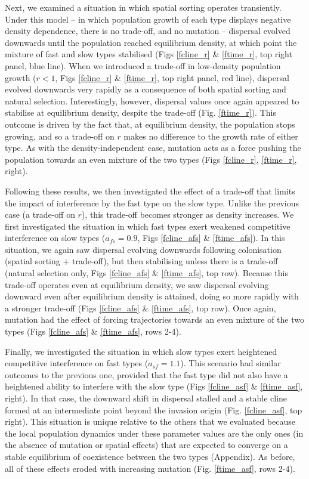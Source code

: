 \documentclass[11pt]{article}
\begin{document}
Next, we examined a situation in which spatial sorting operates transiently.  Under this model -- in which population growth of each type displays negative density dependence, there is no trade-off, and no mutation -- dispersal evolved downwards until the population reached equilibrium density, at which point the mixture of fast and slow types stabilised (Figs \ref{fcline_r} \& \ref{ftime_r}, top right panel, blue line). When we introduced a trade-off in low-density population growth ($r<1$, Figs \ref{fcline_r} \& \ref{ftime_r}, top right panel, red line), dispersal evolved downwards very rapidly as a consequence of both spatial sorting and natural selection.  Interestingly, however, dispersal values once again appeared to stabilise at equilibrium density, despite the trade-off (Fig. \ref{ftime_r}).  This outcome is driven by the fact that, at equilibrium density, the population stops growing, and so a trade-off on $r$ makes no difference to the growth rate of either type.  As with the density-independent case, mutation acts as a force pushing the population towards an even mixture of the two types (Figs \ref{fcline_r}, \ref{ftime_r}, right).

Following these results, we then investigated the effect of a trade-off that limits the impact of interference by the fast type on the slow type.  Unlike the previous case (a trade-off on $r$), this trade-off becomes stronger as density increases. We first investigated the situation in which fast types exert weakened competitive interference on slow types ($a_{fs}=0.9$, Figs \ref{fcline_afs} \& \ref{ftime_afs}). In this situation, we again saw dispersal evolving downwards following colonisation (spatial sorting + trade-off), but then stabilising unless there is a trade-off (natural selection only, Figs \ref{fcline_afs} \& \ref{ftime_afs}, top row).  Because this trade-off operates even at equilibrium density, we saw dispersal evolving downward even after equilibrium density is attained, doing so more rapidly with a stronger trade-off (Figs \ref{fcline_afs} \& \ref{ftime_afs}, top row).  Once again, mutation had the effect of forcing trajectories towards an even mixture of the two types (Figs \ref{fcline_afs} \& \ref{ftime_afs}, rows 2-4). 

Finally, we investigated the situation in which slow types exert heightened competitive interference on fast types ($a_{sf}=1.1$).  This scenario had similar outcomes to the previous one, provided that the fast type did not also have a heightened ability to interfere with the slow type (Figs \ref{fcline_asf} \& \ref{ftime_asf}, right). In that case, the downward shift in dispersal stalled and a stable cline formed at an intermediate point beyond the invasion origin (Fig. \ref{fcline_asf}, top right). This situation is unique relative to the others that we evaluated because the local population dynamics under these parameter values are the only ones (in the absence of mutation or spatial effects) that are expected to converge on a stable equilibrium of coexistence between the two types (Appendix). As before, all of these effects eroded with increasing mutation (Fig. \ref{ftime_asf}, rows 2-4).
\end{document}
